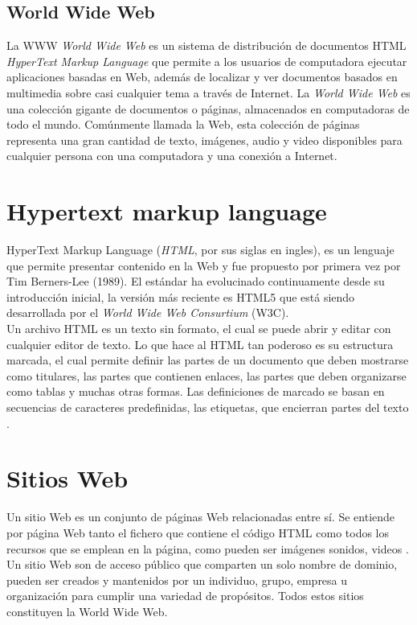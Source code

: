 \subsection{World Wide Web}

La WWW \textit{World Wide Web} es un sistema de distribución de documentos HTML \textit{HyperText Markup Language} 
que permite a los usuarios de computadora ejecutar aplicaciones basadas en Web, además de localizar y ver documentos 
basados en multimedia sobre casi cualquier tema a través de Internet.
La \textit{World Wide Web} es una colección gigante de documentos o páginas, almacenados en computadoras de todo el mundo. 
Comúnmente llamada la Web, esta colección de páginas representa una gran cantidad de texto, imágenes, audio y video disponibles 
para cualquier persona con una computadora y una conexión a Internet.

\section[HTML]{Hypertext markup language}
HyperText Markup Language (\textit{HTML}, por sus siglas en ingles), 
es un lenguaje que permite presentar contenido en la Web y fue propuesto por primera vez por 
Tim Berners-Lee (1989). El estándar ha evolucinado continuamente desde su introducción inicial, 
la versión más reciente es HTML5 que está siendo desarrollada por el \textit{World Wide Web Consurtium} (W3C).
\\
Un archivo HTML es un texto sin formato, el cual se puede abrir y editar con cualquier editor de 
texto. Lo que hace al HTML tan poderoso es su estructura marcada, el cual permite definir las partes 
de un documento que deben mostrarse como titulares, las partes que contienen enlaces, las partes que deben 
organizarse como tablas y muchas otras formas. Las definiciones de marcado se basan en secuencias de caracteres 
predefinidas, las etiquetas, que encierran partes del texto \citep{CTHTML}. 


\section{Sitios Web}
Un sitio Web es un conjunto de páginas Web relacionadas entre sí. Se entiende por página Web tanto el fichero 
que contiene el código HTML como todos los recursos que se emplean en la página, como pueden ser
imágenes sonidos, videos \citep{CTsW}.
Un sitio Web son de acceso público que comparten un solo nombre de dominio, pueden ser creados y 
mantenidos por un individuo, grupo, empresa u organización para cumplir una variedad de propósitos. 
Todos estos sitios constituyen la World Wide Web. 

